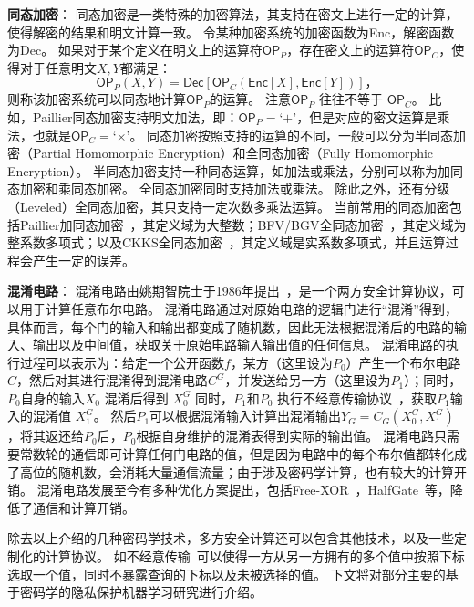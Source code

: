 \textbf{同态加密}：
同态加密是一类特殊的加密算法，其支持在密文上进行一定的计算，使得解密的结果和明文计算一致。
%
令某种加密系统的加密函数为\textsf{Enc}，解密函数为\textsf{Dec}。
%
如果对于某个定义在明文上的运算符$\mathsf{OP}_P$，存在密文上的运算符$\mathsf{OP}_C$，使得对于任意明文$X, Y$都满足：
\begin{equation}
    \textsf{OP}_P(X, Y) = \mathsf{Dec}[\mathsf{OP}_C (\mathsf{Enc}[X], \mathsf{Enc}[Y])]，
\end{equation}
%
则称该加密系统可以同态地计算$\mathsf{OP}_P$的运算。
%
注意$\mathsf{OP}_P$ 往往不等于 $\mathsf{OP}_C$。
比如，Paillier同态加密支持明文加法，即：$\mathsf{OP}_P=$`$+$'，但是对应的密文运算是乘法，也就是$\mathsf{OP}_C=$`$\times$'。
%
同态加密按照支持的运算的不同，一般可以分为半同态加密（Partial Homomorphic Encryption）和全同态加密（Fully Homomorphic Encryption）。
%
半同态加密支持一种同态运算，如加法或乘法，分别可以称为加同态加密和乘同态加密。
%
全同态加密同时支持加法或乘法。
%
除此之外，还有分级（Leveled）全同态加密，其只支持一定次数多乘法运算。
%
当前常用的同态加密包括Paillier加同态加密~\cite{paillier1999}，其定义域为大整数；BFV/BGV全同态加密~\cite{2012bfv1,2012bfv2,2014bgv}，其定义域为整系数多项式；以及CKKS全同态加密~\cite{ckks2017}，其定义域是实系数多项式，并且运算过程会产生一定的误差。


\textbf{混淆电路}：
混淆电路由姚期智院士于1986年提出~\cite{yao1986gc}，是一个两方安全计算协议，可以用于计算任意布尔电路。
%
混淆电路通过对原始电路的逻辑门进行“混淆”得到，具体而言，每个门的输入和输出都变成了随机数，因此无法根据混淆后的电路的输入、输出以及中间值，获取关于原始电路输入输出值的任何信息。
%
混淆电路的执行过程可以表示为：给定一个公开函数$f$，某方（这里设为$P_0$）产生一个布尔电路$C$，然后对其进行混淆得到混淆电路$C^G$，并发送给另一方（这里设为$P_1$）；同时，$P_0$自身的输入$X_0$ 混淆后得到 $X_0^G$
%
同时，$P_1$和$P_0$ 执行不经意传输协议~\cite{yadav_2022_ot_survey}，获取$P_1$输入的混淆值 $X_1^G$。
%
然后$P_1$可以根据混淆输入计算出混淆输出$Y_G = C_G(X_0^G, X_1^G)$，将其返还给$P_0$后，$P_0$根据自身维护的混淆表得到实际的输出值。
%
混淆电路只需要常数轮的通信即可计算任何门电路的值，但是因为电路中的每个布尔值都转化成了高位的随机数，会消耗大量通信流量；由于涉及密码学计算，也有较大的计算开销。
%
混淆电路发展至今有多种优化方案提出，包括Free-XOR~\cite{kolesnikov2008free_xor}，HalfGate~\cite{zahur2015halfgate}等，降低了通信和计算开销。
%

除去以上介绍的几种密码学技术，多方安全计算还可以包含其他技术，以及一些定制化的计算协议。
如不经意传输~\cite{yadav_2022_ot_survey,chou_2015_simplest_ot}可以使得一方从另一方拥有的多个值中按照下标选取一个值，同时不暴露查询的下标以及未被选择的值。
%
下文将对部分主要的基于密码学的隐私保护机器学习研究进行介绍。



